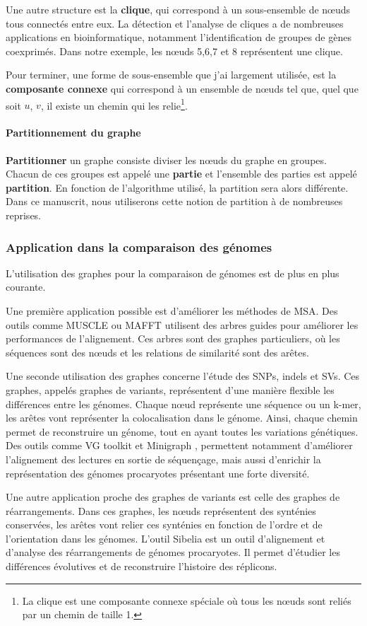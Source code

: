 Une autre structure est la \textbf{clique}, qui correspond à un sous-ensemble de n\oe uds tous connectés entre eux. La détection et l'analyse de cliques a de nombreuses applications en bioinformatique, notamment l'identification de groupes de gènes coexprimés. Dans notre exemple, les n\oe uds 5,6,7 et 8 représentent une clique. 

Pour terminer, une forme de sous-ensemble que j'ai largement utilisée, est la \textbf{composante connexe} qui correspond à un ensemble de n\oe uds tel que, quel que soit $u$, $v$, il existe un chemin  qui les relie\footnote{La clique est une composante connexe spéciale où tous les n\oe uds sont reliés par un chemin de taille 1.}.

\paragraph{Partitionnement du graphe}

\textbf{Partitionner} un graphe consiste diviser les n\oe uds du graphe en groupes. Chacun de ces groupes est appelé une \textbf{partie} et l'ensemble des parties est appelé \textbf{partition}. En fonction de l'algorithme utilisé, la partition sera alors différente. Dans ce manuscrit, nous utiliserons cette notion de partition à  de nombreuses reprises.

\subsubsection{Application dans la comparaison des génomes}

L'utilisation des graphes pour la comparaison de génomes est de plus en plus courante. 

Une première application possible est d'améliorer les méthodes de MSA. Des outils comme MUSCLE ou MAFFT \cite{katoh_mafft_2013} utilisent des arbres guides pour améliorer les performances de l'alignement. Ces arbres sont des graphes particuliers, où les séquences sont des n\oe uds et les relations de similarité sont des arêtes.

\newpage
Une seconde utilisation des graphes concerne l'étude des SNPs, indels et SVs. Ces graphes, appelés graphes de variants, représentent d'une manière flexible les différences entre les génomes. Chaque n\oe ud représente une séquence ou un k-mer, les arêtes vont représenter la colocalisation dans le génome. Ainsi, chaque chemin permet de reconstruire un génome, tout en ayant toutes les variations génétiques. Des outils comme VG toolkit \cite{garrison_variation_2018} et Minigraph \cite{li_design_2020}, permettent notamment d'améliorer l'alignement des lectures en sortie de séquençage, mais aussi d'enrichir la représentation des génomes procaryotes présentant une forte diversité.

Une autre application proche des graphes de variants est celle des graphes de réarrangements. Dans ces graphes, les n\oe uds représentent des synténies conservées, les arêtes vont relier ces synténies en fonction de l'ordre et de l'orientation dans les génomes. L'outil Sibelia \cite{minkin_sibelia_2013} est un outil d'alignement et d'analyse des réarrangements de génomes procaryotes. Il permet  d'étudier les différences évolutives et de reconstruire l'histoire des réplicons.

